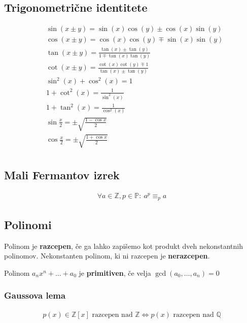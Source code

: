 	\subsection*{Trigonometrične identitete}
	\begin{align*}
		&\sin(x \pm y) = \sin(x) \cos(y) \pm \cos(x) \sin(y) \\
		&\cos(x \pm y) = \cos(x) \cos(y) \mp \sin(x) \sin(y)\\
		&\tan(x \pm y) = \frac{\tan(x)\pm \tan(y)}{1 \mp \tan(x) \tan(y)}\\
		&\cot(x \pm y) = \frac{\cot(x)\cot(y) \mp 1}{\tan(x) \pm \tan(y)}\\
		&\sin^2(x)+\cos^2(x) = 1\\
		&1+\cot^2(x) = \frac{1}{\sin^2(x)}\\
		&1+\tan^2(x) = \frac{1}{\cos^2(x)}\\
		&\sin\frac{x}{2} = \pm\sqrt{\frac{1-\cos x}{2}}\\
		&\cos\frac{x}{2} = \pm\sqrt{\frac{1+\cos x}{2}}\\
	\end{align*}

	\subsection*{Mali Fermantov izrek}
	\begin{align*}
		\forall a \in \mathbb{Z}, p \in \mathbb{P}:\ a^p \equiv_p a
	\end{align*}

	\subsection*{Polinomi}
	Polinom je \textbf{razcepen}, če ga lahko zapišemo kot produkt dveh nekonstantnih polinomov.
	Nekonstanten polinom, ki ni razcepen je \textbf{nerazcepen}.

	Polinom $a_n x^n + \dots + a_0$ je \textbf{primitiven}, če velja $\gcd(a_0, \dots, a_n) = 0$

	\subsubsection*{Gaussova lema}
	\begin{align*}
		p(x) \in \mathbb{Z}[x] \text{ razcepen nad } \mathbb{Z} \iff p(x) \text{ razcepen nad } \mathbb{Q}
	\end{align*}

